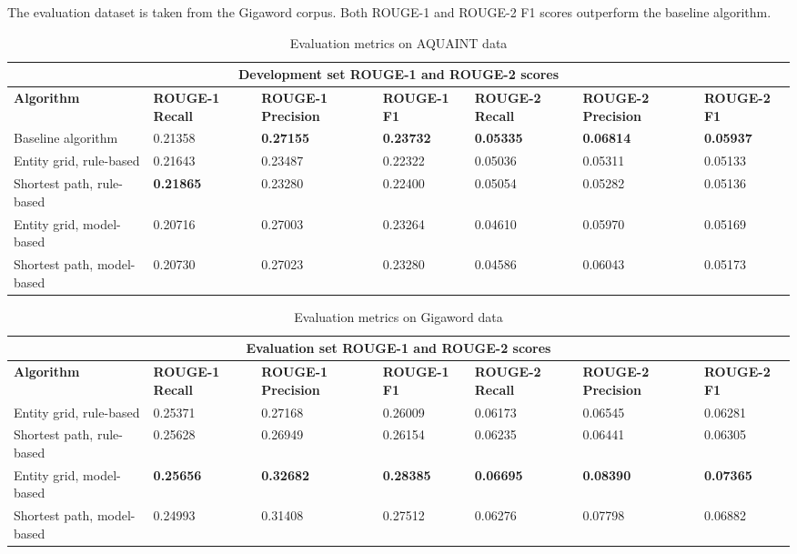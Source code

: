 \documentclass[11pt]{article}
\begin{document}
The evaluation dataset is taken from the Gigaword corpus. Both ROUGE-1 and ROUGE-2 F1 scores outperform the baseline algorithm.

\begin{table}[h]
\begin{tabular}{|p{4.3cm}||p{1.735cm}|p{1.78cm}|p{1.735cm}|p{1.735cm}|p{1.78cm}|p{1.735cm}| }
 \hline
 \multicolumn{7}{|c|}{Development set ROUGE-1 and ROUGE-2 scores} \\
 \hline
 \textbf{Algorithm} & \textbf{ROUGE-1 Recall} & \textbf{ROUGE-1 Precision} & \textbf{ROUGE-1 F1} & \textbf{ROUGE-2 Recall} & \textbf{ROUGE-2 Precision} & \textbf{ROUGE-2 F1}\\
 \hline
Baseline algorithm & 0.21358 & \textbf{0.27155} & \textbf{0.23732} & \textbf{0.05335} & \textbf{0.06814} & \textbf{0.05937} \\ 
Entity grid, rule-based & 0.21643 & 0.23487 & 0.22322 & 0.05036 & 0.05311 & 0.05133 \\
Shortest path, rule-based & \textbf{0.21865} & 0.23280 & 0.22400 & 0.05054 & 0.05282 & 0.05136 \\
Entity grid, model-based & 0.20716 & 0.27003 & 0.23264 & 0.04610 & 0.05970 & 0.05169 \\
Shortest path, model-based & 0.20730 & 0.27023 & 0.23280 & 0.04586 & 0.06043 & 0.05173 \\
\hline
\end{tabular}
\caption{Evaluation metrics on AQUAINT data}
\label{tab:dev} 
\end{table}

\begin{table}[h]
\begin{tabular}{|p{4.3cm}||p{1.735cm}|p{1.78cm}|p{1.735cm}|p{1.735cm}|p{1.78cm}|p{1.735cm}| }
 \hline
 \multicolumn{7}{|c|}{Evaluation set ROUGE-1 and ROUGE-2 scores} \\
 \hline
 \textbf{Algorithm} & \textbf{ROUGE-1 Recall} & \textbf{ROUGE-1 Precision} & \textbf{ROUGE-1 F1} & \textbf{ROUGE-2 Recall} & \textbf{ROUGE-2 Precision} & \textbf{ROUGE-2 F1}\\
 \hline
Entity grid, rule-based & 0.25371 & 0.27168 & 0.26009 & 0.06173 & 0.06545 & 0.06281 \\
Shortest path, rule-based & 0.25628 & 0.26949 & 0.26154 & 0.06235 & 0.06441 & 0.06305 \\
Entity grid, model-based & \textbf{0.25656} & \textbf{0.32682} & \textbf{0.28385} & \textbf{0.06695} & \textbf{0.08390} & \textbf{0.07365} \\
Shortest path, model-based & 0.24993 & 0.31408 & 0.27512 & 0.06276 & 0.07798 & 0.06882 \\
\hline
\end{tabular}
\caption{Evaluation metrics on Gigaword data}
\label{tab:dev} 
\end{table}
\end{document}
